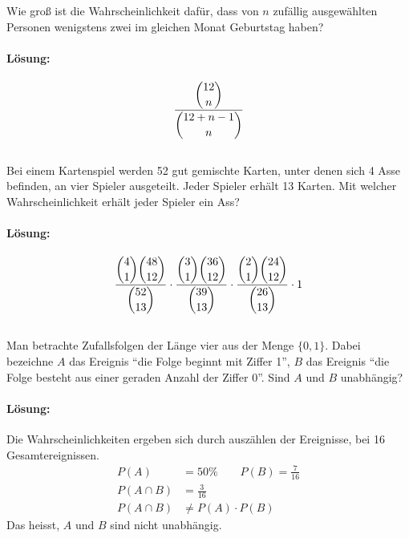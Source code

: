 \documentclass[ngerman]{scrartcl}
\begin{document}
Wie groß ist die Wahrscheinlichkeit dafür, dass von $n$ zufällig ausgewählten Personen wenigstens zwei im gleichen Monat Geburtstag haben?
\paragraph{Lösung:}
\[  \frac{\dbinom{12}{n}}{\dbinom{12+n-1}{n}}   \]


\subsection{}

Bei einem Kartenspiel werden 52 gut gemischte Karten, unter denen sich 4 Asse befinden, an vier Spieler ausgeteilt. Jeder Spieler erhält 13 Karten. Mit welcher Wahrscheinlichkeit erhält jeder Spieler ein Ass?

\paragraph{Lösung:}
\begin{equation}
\frac{\dbinom{4}{1}\dbinom{48}{12}}{\dbinom{52}{13}} \cdot 
\frac{\dbinom{3}{1}\dbinom{36}{12}}{\dbinom{39}{13}} \cdot
\frac{\dbinom{2}{1}\dbinom{24}{12}}{\dbinom{26}{13}} \cdot 1
\end{equation}
\subsection{}

Man betrachte Zufallsfolgen der Länge vier aus der Menge $\lbrace 0, 1 \rbrace$. Dabei bezeichne $A$ das Ereignis "`die Folge beginnt mit Ziffer 1"', $B$ das Ereignis "`die Folge besteht aus einer geraden Anzahl der Ziffer 0"'. Sind $A$ und $B$ unabhängig?

\paragraph{Lösung:}
Die Wahrscheinlichkeiten ergeben sich durch auszählen der Ereignisse, bei 16 Gesamtereignissen.
\begin{align}
P(A) &= 50 \% \qquad P(B) = \frac{7}{16}\\
P(A\cap B) &= \frac{3}{16}\\
P(A\cap B) &\neq P(A) \cdot P(B)
\end{align}
Das heisst, $A$ und $B$ sind nicht unabhängig.

\subsection{}
\end{document}
